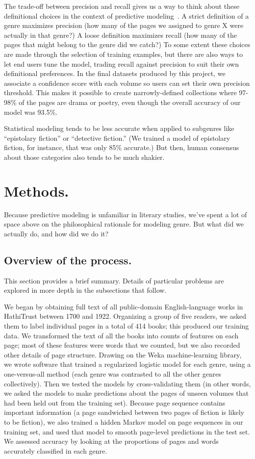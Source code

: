 \documentclass[paper=a4, fontsize=12pt]{scrartcl}
\numberwithin{equation}{section}		%
\numberwithin{figure}{section}			%
\numberwithin{table}{section}				%
\begin{document}
The trade-off between precision and recall gives us a way to think about these definitional choices in the context of predictive modeling~\cite{buckland:recall}. A strict definition of a genre maximizes precision (how many of the pages we assigned to genre X were actually in that genre?) A loose definition maximizes recall (how many of the pages that might belong to the genre did we catch?) To some extent these choices are made through the selection of training examples, but there are also ways to let end users tune the model, trading recall against precision to suit their own definitional preferences. In the final datasets produced by this project, we associate a confidence score with each volume so users can set their own precision threshold. This makes it possible to create narrowly-defined collections where 97-98\% of the pages are drama or poetry, even though the overall accuracy of our model was 93.5\%.

Statistical modeling tends to be less accurate when applied to subgenres like ``epistolary fiction'' or ``detective fiction.'' (We trained a model of epistolary fiction, for instance, that was only 85\% accurate.) But then, human consensus about those categories also tends to be much shakier.

\section{Methods.}

Because predictive modeling is unfamiliar in literary studies, we've spent a lot of space above on the philosophical rationale for modeling genre. But what did we actually do, and how did we do it?

\subsection{Overview of the process.}
This section provides a brief summary. Details of particular problems are explored in more depth in the subsections that follow. 

We began by obtaining full text of all public-domain English-language works in HathiTrust between 1700 and 1922. Organizing a group of five readers, we asked them to label individual pages in a total of 414 books; this produced our training data. We transformed the text of all the books into counts of features on each page; most of these features were words that we counted, but we also recorded other details of page structure. Drawing on the Weka machine-learning library, we wrote software that trained a regularized logistic model for each genre, using a one-versus-all method (each genre was contrasted to all the other genres collectively). Then we tested the models by cross-validating them (in other words, we asked the models to make predictions about the pages of unseen volumes that had been held out from the training set). Because page sequence contains important information (a page sandwiched between two pages of fiction is likely to be fiction), we also trained a hidden Markov model on page sequences in our training set, and used that model to smooth page-level predictions in the test set. We assessed accuracy by looking at the proportions of pages and words accurately classified in each genre.
\end{document}

